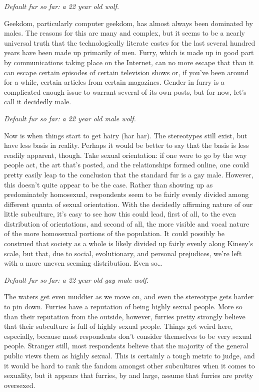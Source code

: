 \textit{Default fur so far: a 22 year old wolf.}

Geekdom, particularly computer geekdom, has almost always been dominated by males.  The reasons for this are many and complex, but it seems to be a nearly universal truth that the technologically literate castes for the last several hundred years have been made up primarily of men.  Furry, which is made up in good part by communications taking place on the Internet, can no more escape that than it can escape certain episodes of certain television shows or, if you've been around for a while, certain articles from certain magazines.  Gender in furry is a complicated enough issue to warrant several of its own posts, but for now, let's call it decidedly male.

\textit{Default fur so far: a 22 year old male wolf.}

Now is when things start to get hairy (har har).  The stereotypes still exist, but have less basis in reality.  Perhaps it would be better to say that the basis is less readily apparent, though.  Take sexual orientation: if one were to go by the way people act, the art that's posted, and the relationships formed online, one could pretty easily leap to the conclusion that the standard fur is a gay male.  However, this doesn't quite appear to be the case.  Rather than showing up as predominately homosexual, respondents seem to be fairly evenly divided among different quanta of sexual orientation.  With the decidedly affirming nature of our little subculture, it's easy to see how this could lead, first of all, to the even distribution of orientations, and second of all, the more visible and vocal nature of the more homosexual portions of the population.  It could possibly be construed that society as a whole is likely divided up fairly evenly along Kinsey's scale, but that, due to social, evolutionary, and personal prejudices, we're left with a more uneven seeming distribution.  Even so…

\textit{Default fur so far: a 22 year old gay male wolf.}

The waters get even muddier as we move on, and even the stereotype gets harder to pin down.  Furries have a reputation of being highly sexual people.  More so than their reputation from the outside, however, furries pretty strongly believe that their subculture is full of highly sexual people.  Things get weird here, especially, because most respondents don't consider themselves to be very sexual people.  Stranger still, most respondents believe that the majority of the general public views them as highly sexual.  This is certainly a tough metric to judge, and it would be hard to rank the fandom amongst other subcultures when it comes to sexuality, but it appears that furries, by and large, assume that furries are pretty oversexed.

